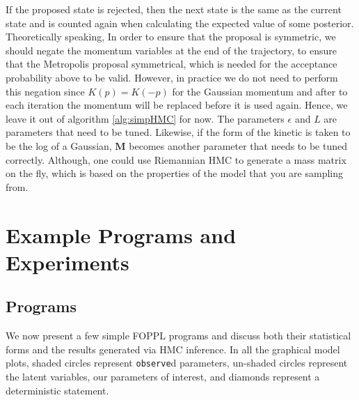 \documentclass[twoside]{article}
\begin{document}
If the proposed state is rejected, then the next state is the same as the current state and is counted again when calculating the expected value of some posterior. 
Theoretically speaking, In order to ensure that the proposal is symmetric, we should negate the momentum variables at the end of the trajectory, to ensure that the Metropolis proposal symmetrical, which is needed for the acceptance probability above to be valid. However, in practice we do not need to perform this negation since $K(p) = K(-p)$ for the Gaussian momentum and after to each iteration the momentum will be replaced before it is used again. Hence, we leave it out of algorithm \ref{alg:simpHMC} for now. 
The parameters  $\epsilon$ and $L$ are parameters that need to be tuned. Likewise, if the form of the kinetic is taken to be the log of a Gaussian, $\textbf{M}$ becomes another parameter that needs to be tuned correctly. Although, one could use Riemannian HMC \citep{girolami2011riemann} to generate a mass matrix on the fly, which is based on the properties of the model that you are sampling from.

\section{Example Programs and Experiments}
\label{sec:exampprog}
\subsection{Programs}

We now present a few simple FOPPL programs and discuss both their statistical forms and the results generated via HMC inference. In all the graphical model plots, shaded circles represent \texttt{observe}d parameters, un-shaded circles represent the latent variables, our parameters of interest, and diamonds represent a deterministic statement. 
\end{document}
